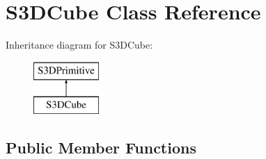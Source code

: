 \hypertarget{class_s3_d_cube}{
\section{S3DCube Class Reference}
\label{class_s3_d_cube}
}
Inheritance diagram for S3DCube:\begin{figure}[H]
\begin{center}
\leavevmode
\includegraphics[height=2cm]{class_s3_d_cube}
\end{center}
\end{figure}
\subsection*{Public Member Functions}
